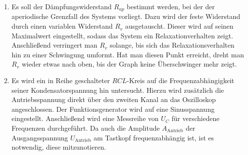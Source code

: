 \begin{enumerate}
     \item Es soll der Dämpfungswiderstand $R_{ap}$ bestimmt werden, bei der der aperiodische Grenzfall des Systems vorliegt.
     Dazu wird der feste Widerstand durch einen variablen Widerstand $R_v$
     ausgetauscht. Dieser wird auf seinen Maximalwert eingestellt, sodass das System ein Relaxationverhalten zeigt.
      Anschließend verringert man $R_v$ solange, bis sich das Relaxationsverhalten hin zu einer Schwingung umformt.
      Hat man diesen Punkt erreicht, dreht man $R_v$ wieder etwas nach oben, bis der Graph keine Überschwinger mehr zeigt.
      \item Es wird ein in Reihe geschalteter $RCL$-Kreis auf die Frequenzabhängigkeit seiner Kondensatorspannung hin untersucht.
      Hierzu wird zusätzlich die Antriebsspannung direkt über den zweiten Kanal an das Oszilloskop angeschlossen. Der Funktionsgenerator wird auf eine Sinusspannung eingestellt.
      Anschließend wird eine Messreihe von $U_C$ für verschiedene Frequenzen durchgeführt.
       Da auch die Amplitude $A_{\text{Antrieb}}$ der Ausgangsspannung $U_{\text{Antrieb}}$ am Tastkopf frequenzabhängig ist, ist es notwendig, diese mitzunotieren.


\end{enumerate}
